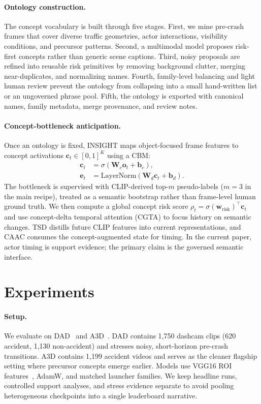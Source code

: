 \documentclass[11pt]{article}
\newcommand{\method}{\textsc{INSIGHT}}
\newcommand{\cbm}{\textsc{CBM}}
\newcommand{\caac}{\textsc{CAAC}}
\newcommand{\cgta}{\textsc{CGTA}}
\newcommand{\tsd}{\textsc{TSD}}
\begin{document}
\paragraph{Ontology construction.}
The concept vocabulary is built through five stages. First, we mine pre-crash
frames that cover diverse traffic geometries, actor interactions, visibility
conditions, and precursor patterns. Second, a multimodal model proposes
risk-first concepts rather than generic scene captions. Third, noisy proposals
are refined into reusable risk primitives by removing background clutter,
merging near-duplicates, and normalizing names. Fourth, family-level balancing
and light human review prevent the ontology from collapsing into a small
hand-written list or an ungoverned phrase pool. Fifth, the ontology is exported
with canonical names, family metadata, merge provenance, and review notes.

\paragraph{Concept-bottleneck anticipation.}
Once an ontology is fixed, \method{} maps object-focused frame features to
concept activations $\mathbf{c}_t\in[0,1]^K$ using a \cbm{}:
\begin{equation}
  \begin{split}
  \mathbf{c}_t &= \sigma(\mathbf{W}_c\mathbf{o}_t+\mathbf{b}_c),\\
  \mathbf{e}_t &= \mathrm{LayerNorm}(\mathbf{W}_d\mathbf{c}_t+\mathbf{b}_d).
  \end{split}
\end{equation}
The bottleneck is supervised with CLIP-derived top-$m$ pseudo-labels
($m=3$ in the main recipe), treated as a semantic bootstrap rather than
frame-level human ground truth. We then compute a global concept risk score
$\rho_t=\sigma(\mathbf{w}_{\mathrm{risk}})^\top\mathbf{c}_t$ and use
concept-delta temporal attention (\cgta{}) to focus history on semantic changes.
\tsd{} distills future CLIP features into current representations, and \caac{}
consumes the concept-augmented state for timing. In the current paper, actor
timing is support evidence; the primary claim is the governed semantic interface.

\section{Experiments}

\paragraph{Setup.}
We evaluate on DAD~\citep{ref4} and A3D~\citep{liao2024crash}. DAD contains
1,750 dashcam clips (620 accident, 1,130 non-accident) and stresses noisy,
short-horizon pre-crash transitions. A3D contains 1,199 accident videos and
serves as the cleaner flagship setting where precursor concepts emerge earlier.
Models use VGG16 ROI features~\citep{ref31}, AdamW, and matched launcher
families. We keep headline runs, controlled support analyses, and stress
evidence separate to avoid pooling heterogeneous checkpoints into a single
leaderboard narrative.
\end{document}
